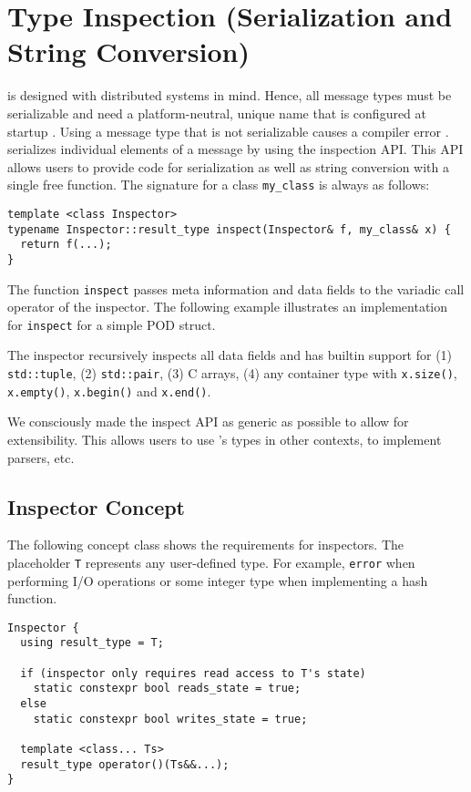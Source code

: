 \section{Type Inspection (Serialization and String Conversion)}
\label{type-inspection}

\lib is designed with distributed systems in mind. Hence, all message types must be serializable and need a platform-neutral, unique name that is configured at startup . Using a message type that is not serializable causes a compiler error . \lib serializes individual elements of a message by using the inspection API. This API allows users to provide code for serialization as well as string conversion with a single free function. The signature for a class \lstinline^my_class^ is always as follows:

\begin{lstlisting}
template <class Inspector>
typename Inspector::result_type inspect(Inspector& f, my_class& x) {
  return f(...);
}
\end{lstlisting}

The function \lstinline^inspect^ passes meta information and data fields to the variadic call operator of the inspector. The following example illustrates an implementation for \lstinline^inspect^ for a simple POD struct.



The inspector recursively inspects all data fields and has builtin support for (1) \lstinline^std::tuple^, (2) \lstinline^std::pair^, (3) C arrays, (4) any container type with \lstinline^x.size()^, \lstinline^x.empty()^, \lstinline^x.begin()^ and \lstinline^x.end()^.

We consciously made the inspect API as generic as possible to allow for extensibility. This allows users to use \lib's types in other contexts, to implement parsers, etc.

\subsection{Inspector Concept}

The following concept class shows the requirements for inspectors. The placeholder \lstinline^T^ represents any user-defined type. For example, \lstinline^error^ when performing I/O operations or some integer type when implementing a hash function.

\begin{lstlisting}
Inspector {
  using result_type = T;
  
  if (inspector only requires read access to T's state)
    static constexpr bool reads_state = true;
  else
    static constexpr bool writes_state = true;
  
  template <class... Ts>
  result_type operator()(Ts&&...);
}
\end{lstlisting}

